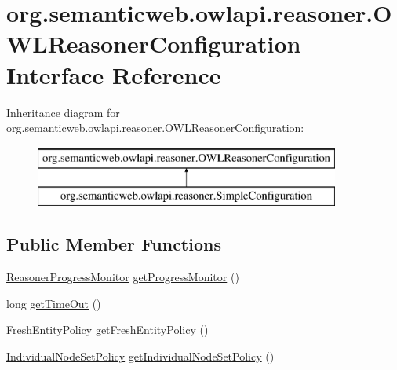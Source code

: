 \hypertarget{interfaceorg_1_1semanticweb_1_1owlapi_1_1reasoner_1_1_o_w_l_reasoner_configuration}{\section{org.\-semanticweb.\-owlapi.\-reasoner.\-O\-W\-L\-Reasoner\-Configuration Interface Reference}
\label{interfaceorg_1_1semanticweb_1_1owlapi_1_1reasoner_1_1_o_w_l_reasoner_configuration}
}
Inheritance diagram for org.\-semanticweb.\-owlapi.\-reasoner.\-O\-W\-L\-Reasoner\-Configuration\-:\begin{figure}[H]
\begin{center}
\leavevmode
\includegraphics[height=2.000000cm]{interfaceorg_1_1semanticweb_1_1owlapi_1_1reasoner_1_1_o_w_l_reasoner_configuration}
\end{center}
\end{figure}
\subsection*{Public Member Functions}
\begin{DoxyCompactItemize}
\item 
\hyperlink{interfaceorg_1_1semanticweb_1_1owlapi_1_1reasoner_1_1_reasoner_progress_monitor}{Reasoner\-Progress\-Monitor} \hyperlink{interfaceorg_1_1semanticweb_1_1owlapi_1_1reasoner_1_1_o_w_l_reasoner_configuration_a9d398599041c110b704b810fe05e3a10}{get\-Progress\-Monitor} ()
\item 
long \hyperlink{interfaceorg_1_1semanticweb_1_1owlapi_1_1reasoner_1_1_o_w_l_reasoner_configuration_abe360b719e310b935dd1dcb8fb6b5869}{get\-Time\-Out} ()
\item 
\hyperlink{enumorg_1_1semanticweb_1_1owlapi_1_1reasoner_1_1_fresh_entity_policy}{Fresh\-Entity\-Policy} \hyperlink{interfaceorg_1_1semanticweb_1_1owlapi_1_1reasoner_1_1_o_w_l_reasoner_configuration_a46c2caa3b80be560650ec6b787f753c7}{get\-Fresh\-Entity\-Policy} ()
\item 
\hyperlink{enumorg_1_1semanticweb_1_1owlapi_1_1reasoner_1_1_individual_node_set_policy}{Individual\-Node\-Set\-Policy} \hyperlink{interfaceorg_1_1semanticweb_1_1owlapi_1_1reasoner_1_1_o_w_l_reasoner_configuration_a210902b91658a84a04d9bc616f13c12a}{get\-Individual\-Node\-Set\-Policy} ()
\end{DoxyCompactItemize}


